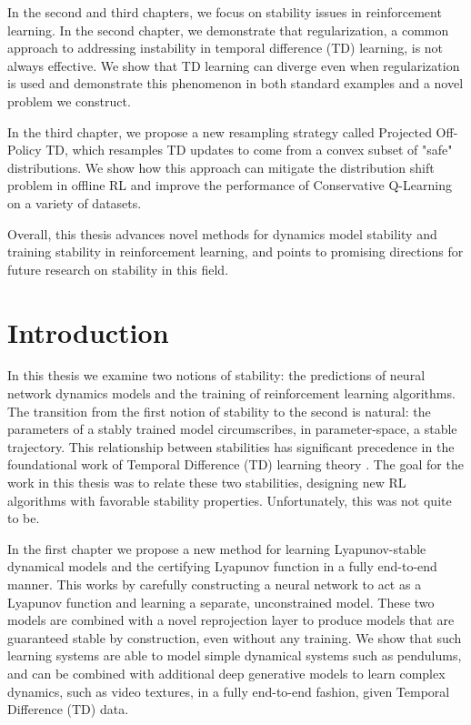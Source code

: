 \documentclass[11pt]{book}
\begin{document}
In the second and third chapters, we focus on stability issues in reinforcement learning. In the second chapter, we demonstrate that regularization, a common approach to addressing instability in temporal difference (TD) learning, is not always effective. We show that TD learning can diverge even when regularization is used and demonstrate this phenomenon in both standard examples and a novel problem we construct.

In the third chapter, we propose a new resampling strategy called Projected Off-Policy TD, which resamples TD updates to come from a convex subset of "safe" distributions. We show how this approach can mitigate the distribution shift problem in offline RL and improve the performance of Conservative Q-Learning on a variety of datasets.

Overall, this thesis advances novel methods for dynamics model stability and training stability in reinforcement learning, and points to promising directions for future research on stability in this field.


\clearpage

\tableofcontents

\cleardoublepage

\linenumbers

\chapter{Introduction}

In this thesis we examine two notions of stability: the predictions of neural network dynamics models and the training of reinforcement learning algorithms. The transition from the first notion of stability to the second is natural: the parameters of a stably trained model circumscribes, in parameter-space, a stable trajectory.
This relationship between stabilities has significant precedence in the foundational work of Temporal Difference (TD) learning theory \cite{tsitsiklis1996analysis}. The goal for the work in this thesis was to relate these two stabilities, designing new RL algorithms with favorable stability properties.
Unfortunately, this was not quite to be.

In the first chapter we propose a new method for learning Lyapunov-stable dynamical models and the certifying Lyapunov function in a fully end-to-end manner. 
This works by carefully constructing a neural network to act as a Lyapunov function and learning a separate, unconstrained model. These two models are combined with a novel reprojection layer to produce models that are guaranteed stable by construction, even without any training. We show that such learning systems are able to model simple dynamical systems such as pendulums, and can be combined with additional deep generative models to learn complex dynamics, such as video textures, in a fully end-to-end fashion, given Temporal Difference (TD) data.
\end{document}
